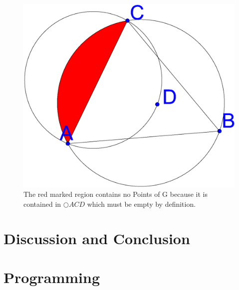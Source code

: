 \documentclass[a4paper,twoside, onecolumn]{IEEEtran}
\begin{document}
\begin{figure}[h!]
\centering
\includegraphics[width=0.2\linewidth]{noPointinRegion.eps}
\caption{The red marked region contains no Points of G because it is contained in $\bigcirc{ACD} $ which must be empty by definition.}
\label{fig:region}
\end{figure}



\section{Discussion and Conclusion}

\section{Programming}



\end{document}
